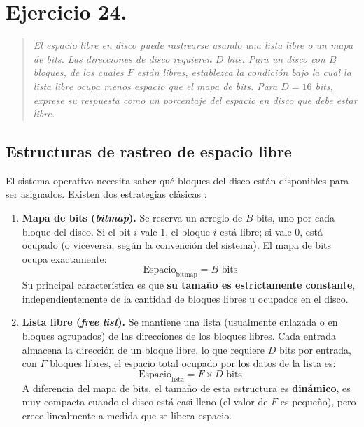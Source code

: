 \documentclass[12pt,letterpaper]{article}
\begin{document}
\newpage

\section*{Ejercicio 24.}

\begin{quote}
  \textit{El espacio libre en disco puede rastrearse usando una lista libre o un mapa de bits. Las direcciones de
    disco requieren $D$ bits. Para un disco con $B$ bloques, de los cuales $F$ están libres, establezca la
    condición bajo la cual la lista libre ocupa menos espacio que el mapa de bits. Para $D = 16$ bits, exprese
    su respuesta como un porcentaje del espacio en disco que debe estar libre.}
\end{quote}
  
\bigskip

\subsection*{Estructuras de rastreo de espacio libre}
\noindent
El sistema operativo necesita saber qué bloques del disco están disponibles para ser asignados.
Existen dos estrategias clásicas \cite{tanenbaum2015,silberschatz2018}:

\begin{enumerate}[leftmargin=1.5cm, label=\textbf{\arabic*.}]
\item \textbf{Mapa de bits (\textit{bitmap}).}
  Se reserva un arreglo de $B$ bits, uno por cada bloque del disco. Si el bit $i$ vale 1, el bloque $i$ está
  libre; si vale 0, está ocupado (o viceversa, según la convención del sistema). El mapa de bits ocupa
  exactamente:
  \[
  \text{Espacio}_{\text{bitmap}} = B \text{ bits}
  \]
  Su principal característica es que \textbf{su tamaño es estrictamente constante}, independientemente de la
  cantidad de bloques libres u ocupados en el disco.
  
\item \textbf{Lista libre (\textit{free list}).}
  Se mantiene una lista (usualmente enlazada o en bloques agrupados) de las direcciones de los bloques libres.
  Cada entrada almacena la dirección de un bloque libre, lo que requiere $D$ bits por entrada, con $F$ bloques
  libres, el espacio total ocupado por los datos de la lista es:
  \[
  \text{Espacio}_{\text{lista}} = F \times D \text{ bits}
  \]
  A diferencia del mapa de bits, el tamaño de esta estructura es \textbf{dinámico}, es muy compacta cuando el
  disco está casi lleno (el valor de $F$ es pequeño), pero crece linealmente a medida que se libera espacio.
\end{enumerate}
\end{document}
